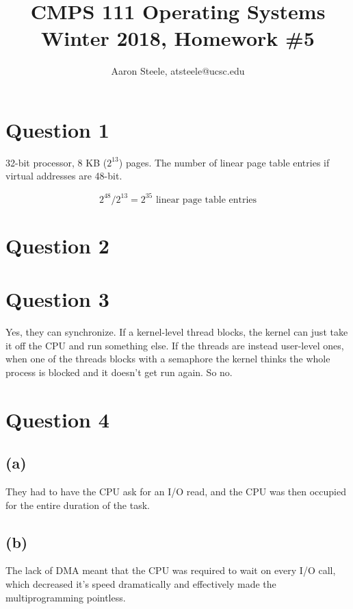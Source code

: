 \documentclass[12pt]{article}
\title{\textbf{CMPS 111 Operating Systems\\ Winter 2018, Homework \#5}}
\date{}
\author{Aaron Steele, atsteele@ucsc.edu}
\begin{document}
	
	\maketitle
	
	\section*{Question 1}
	32-bit processor, 8 KB ($2^{13}$) pages. The number of linear page table entries if virtual addresses are 48-bit.
	
	$$ 2^{48} / 2^{13} = 2^{35} \text{ linear page table entries} $$
	
	
	\section*{Question 2}
	

	
	\section*{Question 3}
	Yes, they can synchronize. If a kernel-level thread blocks, the kernel can just take it off the CPU and run something else. If the threads are instead user-level ones, when one of the threads blocks with a semaphore the kernel thinks the whole process is blocked and it doesn't get run again. So no.


	\section*{Question 4}
	\subsection*{(a)}
	They had to have the CPU ask for an I/O read, and the CPU was then occupied for the entire duration of the task.
	
	\subsection*{(b)}
	The lack of DMA meant that the CPU was required to wait on every I/O call, which decreased it's speed dramatically and effectively made the multiprogramming pointless.
	
\end{document}
